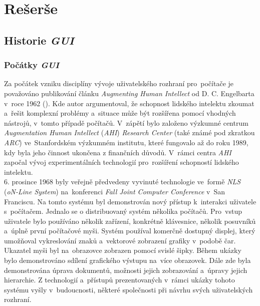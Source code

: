 \documentclass[11pt,twoside,a4paper]{book}
\begin{document}
\chapter{\label{CH:Rash}Rešerše}

\section{\label{SEC:history}Historie \textit{GUI}}
\subsection{Počátky \textit{GUI}}
Za počátek vzniku disciplíny vývoje uživatelského rozhraní pro~počítače je považováno publikování článku \textit{Augmenting Human Intellect} od D. C. Engelbarta v~roce 1962 (\cite{bib:AHI}). Kde autor argumentoval, že schopnost lidského intelektu zkoumat a~řešit komplexní problémy a~situace může být rozšířena pomocí vhodných nástrojů, v~tomto případě počítačů. V~zápětí bylo založeno výzkumné centrum \textit{Augmentation Human Intellect} (\textit{AHI}) \textit{Research Center} (také známé pod zkratkou \textit{ARC}) ve~Stanfordském výzkumném institutu, které fungovalo až do roku 1989, kdy byla jeho činnost ukončena z finančních důvodů. V~rámci centra \textit{AHI} započal vývoj experimentálních technologií pro~rozšíření schopností lidského intelektu.\\
6. prosince 1968 byly veřejně předvedeny vyvinuté technologie ve~formě \textit{NLS} (\textit{oN-Line System}) na~konferenci \textit{Fall Joint Computer Conference} v~San Franciscu. Na tomto systému byl demonstrován nový přístup k~interakci uživatele s~počítačem. Jednalo se o distribuovaný systém několika počítačů. Pro~vstup uživatele bylo používáno několik zařízení, konkrétně klávesnice, několik posuvníků a~úplně první počítačové myši. Systém používal komerčně dostupný displej, který umožňoval vykreslování znaků a~vektorové zobrazení grafiky v~podobě čar. Ukazatel myši byl na~obrazovce zobrazen pomocí svislé šipky. Během ukázky bylo demonstrováno sdílení grafického výstupu na~více obrazovek. Dále zde byla demonstrována úprava dokumentů, možnosti jejich zobrazování a~úpravy jejich hierarchie. Z technologií a~přístupů prezentovaných v~rámci ukázky tohoto systému vyšly v~budoucnosti, některé společnosti při návrhu svých uživatelských rozhraní.\cite{bib:aug}\\
\end{document}
